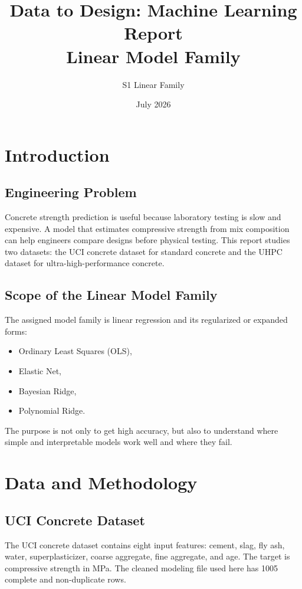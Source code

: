 \documentclass[10pt]{article}
\title{\textbf{Data to Design: Machine Learning Report}\\\large Linear Model Family}
\author{S1 Linear Family}
\date{July 2026}
\begin{document}
\maketitle
{}
\tableofcontents
\newpage
\listoftables
\listoffigures
\newpage
{}

\section{Introduction}

\subsection{Engineering Problem}
Concrete strength prediction is useful because laboratory testing is slow and expensive. A model that estimates compressive strength from mix composition can help engineers compare designs before physical testing. This report studies two datasets: the UCI concrete dataset for standard concrete and the UHPC dataset for ultra-high-performance concrete.

\subsection{Scope of the Linear Model Family}
The assigned model family is linear regression and its regularized or expanded forms:
\begin{itemize}
    \item Ordinary Least Squares (OLS),
    \item Elastic Net,
    \item Bayesian Ridge,
    \item Polynomial Ridge.
\end{itemize}
The purpose is not only to get high accuracy, but also to understand where simple and interpretable models work well and where they fail.

\section{Data and Methodology}

\subsection{UCI Concrete Dataset}
The UCI concrete dataset contains eight input features: cement, slag, fly ash, water, superplasticizer, coarse aggregate, fine aggregate, and age. The target is compressive strength in MPa. The cleaned modeling file used here has 1005 complete and non-duplicate rows.
\end{document}
